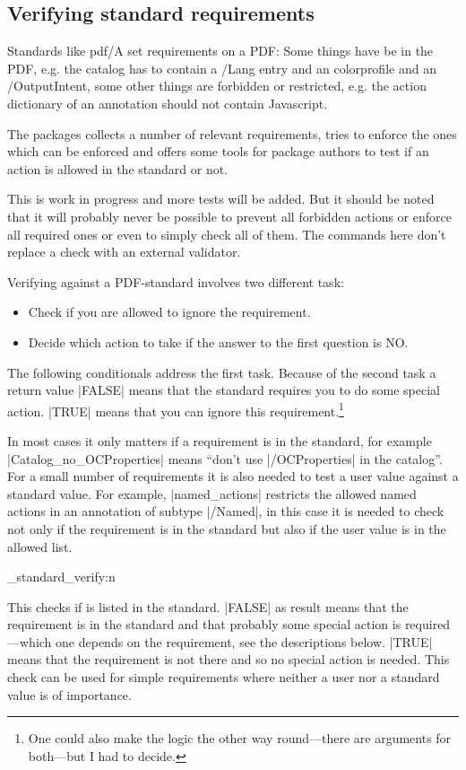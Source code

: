 \documentclass{l3doc}
\begin{document}
\subsection{Verifying standard requirements}

Standards like pdf/A set requirements on a PDF: Some things have be in the PDF, e.g. the catalog has to contain a /Lang entry and an colorprofile and an /OutputIntent, some other things are forbidden or restricted, e.g. the action dictionary of an annotation should not contain Javascript.

The  packages collects a number of relevant requirements, tries to enforce the ones which can be enforced and offers some tools for package authors to test if an action is allowed in the standard or not.

This is work in progress and more tests will be added. But it should be noted that it will probably never be possible to prevent all forbidden actions or enforce all required ones or even to simply check all of them. 
The commands here don't replace a check with an external validator.

Verifying against a PDF-standard involves two different task: 

\begin{itemize}
  \item Check if you are allowed to ignore the requirement. 
  \item Decide which action to take if the answer to the first question is NO.
\end{itemize}

The following conditionals address the first task. Because of the second task a return value |FALSE| means that the standard requires you to do some special action. |TRUE| means that you can ignore this requirement.\footnote{One could also make the logic the other way round---there are arguments for both---but I had to decide.}

In most cases it only matters if a requirement is in the standard, for example |Catalog_no_OCProperties| means \enquote{don't use |/OCProperties| in the catalog}. For a small number of requirements it is also needed to test a user value against a standard value. For example, |named_actions| restricts the allowed named actions in an annotation of subtype |/Named|, in this case it is needed to
check not only if the requirement is in the standard but also if the user value is in the allowed list.

\begin{function}{\pdfmeta_standard_verify:n}
\begin{syntax}
\end{syntax}

This checks if  is listed in the standard. |FALSE| as result means that the requirement is in the standard and that probably some special action is required---which one depends on the requirement, see the descriptions below.
|TRUE| means that the requirement is not there and so no special action is needed.
This check can be used for simple requirements where neither a user nor a standard value is of importance.
\end{function}
\end{document}
